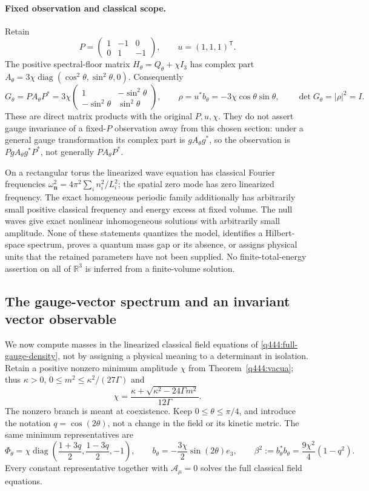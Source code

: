 \paragraph{Fixed observation and classical scope.}
Retain
\[
 P=\begin{pmatrix}1&-1&0\\0&1&-1\end{pmatrix},\qquad
 u=(1,1,1)^{\mathsf T}.
\]
The positive spectral-floor matrix \(H_\theta=Q_\theta+\chi I_3\)
has complex part \(A_\theta=3\chi
\operatorname{diag}(\cos^2\theta,\sin^2\theta,0)\). Consequently
\[
 G_\theta=PA_\theta P^*
 =3\chi\begin{pmatrix}1&-\sin^2\theta\\
                  -\sin^2\theta&\sin^2\theta\end{pmatrix},\qquad
 \rho=u^*b_\theta=-3\chi\cos\theta\sin\theta,\qquad
 \det G_\theta=|\rho|^2=I.
\]
These are direct matrix products with the original \(P,u,\chi\).
They do not assert gauge invariance of a fixed-\(P\) observation away
from this chosen section: under a general gauge transformation its
complex part is \(gA_\theta g^*\), so the observation is
\(PgA_\theta g^*P^*\), not generally \(PA_\theta P^*\).

On a rectangular torus the linearized wave equation has classical
Fourier frequencies
\(\omega_{\mathbf n}^2=4\pi^2\sum_i n_i^2/L_i^2\);
the spatial zero mode has zero linearized frequency. The exact
homogeneous periodic family additionally has arbitrarily small
positive classical frequency and energy excess at fixed volume.
The null waves give exact nonlinear inhomogeneous solutions with
arbitrarily small amplitude. None of these statements quantizes the
model, identifies a Hilbert-space spectrum, proves a quantum mass
gap or its absence, or assigns physical units that the retained
parameters have not been supplied. No finite-total-energy assertion
on all of \(\mathbb R^3\) is inferred from a finite-volume solution.

\subsection{The gauge-vector spectrum and an invariant vector observable}

We now compute masses in the linearized classical field equations of
\eqref{q444:full-gauge-density}, not by assigning a physical meaning to
a determinant in isolation. Retain a positive nonzero minimum amplitude
$\chi$ from Theorem~\ref{q444:vacua}; thus $\kappa>0$,
$0\leq m^2\leq\kappa^2/(27\Gamma)$ and
\[
 \chi=\frac{\kappa+\sqrt{\kappa^2-24\Gamma m^2}}{12\Gamma}.
\]
The nonzero branch is meant at coexistence. Keep $0\leq\theta\leq\pi/4$,
and introduce the notation $q=\cos(2\theta)$, not a change in the field
or its kinetic metric. The same minimum representatives are
\[
 \Phi_\theta=\chi\operatorname{diag}\left(
       \frac{1+3q}{2},\frac{1-3q}{2},-1\right),\qquad
 b_\theta=-\frac{3\chi}{2}\sin(2\theta)e_3,\qquad
 \beta^2:=b_\theta^*b_\theta=\frac{9\chi^2}{4}(1-q^2).
\]
Every constant representative together with $\mathcal A_\mu=0$
solves the full classical field equations.

